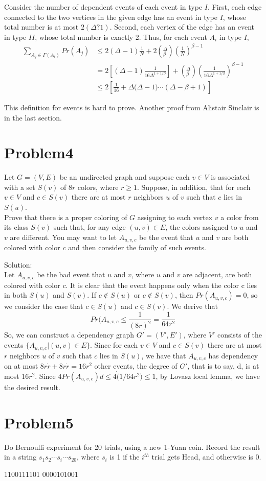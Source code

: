 \documentclass[12pt]{article}
\begin{document}
Consider the number of dependent events of each event in type $I$. First, each edge connected to the two vertices in the given edge has an event in type $I$, whose total number is at most $2(\Delta ? 1)$. Second, each vertex of the edge has an event in type $II$, whose total number is exactly 2. Thus, for each event $A_i$ in type $I$,
\begin{equation}
    \begin{split}
    \sum_{A_j \in \Gamma(A_i)} Pr(A_j) &\le 2(\Delta-1)\frac{1}{N} + 2({}^\Delta_\beta)(\frac{1}{N})^{\beta-1}\\
    &= 2[(\Delta-1)\frac{1}{16\Delta^{1+1/\beta}}] + ({}^\Delta_\beta) (\frac{1}{16\Delta^{1+1/\beta}})^{\beta-1}\\
    &\le 2[\frac{1}{16} + \Delta \dot (\Delta-1) \cdots (\Delta-\beta+1)]
    \end{split}
\end{equation}

This definition for events is hard to prove. Another proof from Alistair Sinclair is in the last section.

\section{Problem4}
Let $G = (V,E)$ be an undirected graph and suppose each $v \in V$ is associated with a set $S(v)$ of $8r$ colors, where $r \ge 1$. Suppose, in addition, that for each $v \in V$ and $c \in S(v)$ there are at most $r$ neighbors $u$ of $v$ such that $c$ lies in $S(u)$. \\
Prove that there is a proper coloring of $G$ assigning to each vertex $v$ a color from its class $S(v)$ such that, for any edge $(u, v) \in E$, the colors assigned to $u$ and $v$ are different. You may want to let $A_{u,v,c}$ be the event that $u$ and $v$ are both colored with color $c$ and then consider the family of such events.

Solution:\\

Let $A_{u,v,c}$ be the bad event that $u$ and $v$, where $u$ and $v$ are adjacent, are both colored with color $c$. It is clear that the event happens only when the color c lies in both $S(u)$ and $S(v)$. If $c \notin S(u)$ or $c \notin S(v)$, then $Pr(A_{u,v,c}) = 0$, so we consider the case that $c \in S(u)$ and $c \in S(v)$. We derive that
\begin{equation}
    Pr(A_{u,v,c} \le \frac{1}{(8r)^2} = \frac{1}{64r^2}
\end{equation}
So, we can construct a dependency graph $G' = (V', E')$, where $V'$ consists of the events
$\{A_{u,v,c}|(u, v) \in E\}$. Since for each $v \in V$ and $c \in S(v)$ there are at most $r$ neighbors $u$ of $v$ such that $c$ lies in $S(u)$, we have that $A_{u,v,c}$ has dependency on at most $8r \dot r +8r \dot r = 16r^2$ other events, the degree of $G'$, that is to say, d, is at most $16r^2$. Since $4 \dot Pr(A_{u,v,c}) \dot d \le 4 \dot (1/64r^2) \le 1$, by Lovasz local lemma, we have the desired result.

\section{Problem5}
Do Bernoulli experiment for 20 trials, using a new 1-Yuan coin. Record the result in a
string $s_1s_2 \cdots s_i \cdots s_{20}$, where $s_i$ is 1 if the $i^{th}$ trial gets Head, and otherwise is 0.

1100111101 0000101001
\end{document}
